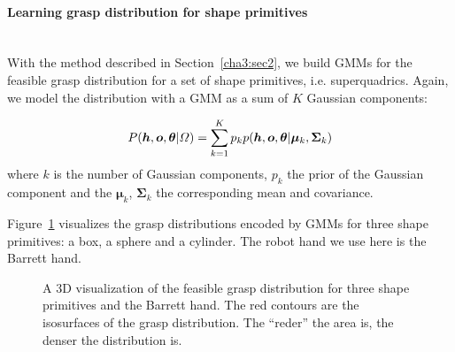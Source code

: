 \paragraph{Learning grasp distribution for shape primitives} ~\\
\label{cha3:sec4:combine:primitivegraspdistribution:learning}
With the method described in Section~\ref{cha3:sec2}, we build GMMs for the feasible grasp distribution for a set of shape primitives, i.e. superquadrics. Again, we model the distribution with a GMM as a sum of $K$ Gaussian components:

\begin{equation}
{
P (\boldsymbol{h},\boldsymbol{o},\boldsymbol\theta \text{\textbar} \varOmega)
= \sum_{k=1}^K {p_{k}p(\boldsymbol{h},\boldsymbol{o},\boldsymbol{\theta} \text{\textbar} {\boldsymbol{\mu}_k}, {\boldsymbol{\Sigma}_k})}
}
\end{equation}
where $k$ is the number of Gaussian components, $p_k$ the prior of the Gaussian component and the $\boldsymbol{\mu}_k$, $\boldsymbol{\Sigma}_k$ the corresponding mean and covariance.

Figure~\ref{fig:primtivedistr} visualizes the grasp distributions encoded by GMMs for three shape primitives: a box, a sphere and a cylinder. The robot hand we use here is the Barrett hand.

\begin{figure}
  \centering
  \caption{A 3D visualization of the feasible grasp distribution for three shape primitives and the Barrett hand. The red contours are the isosurfaces of the grasp distribution. The ``reder'' the area is, the denser the distribution is.}
  \label{fig:primtivedistr}
\end{figure}


